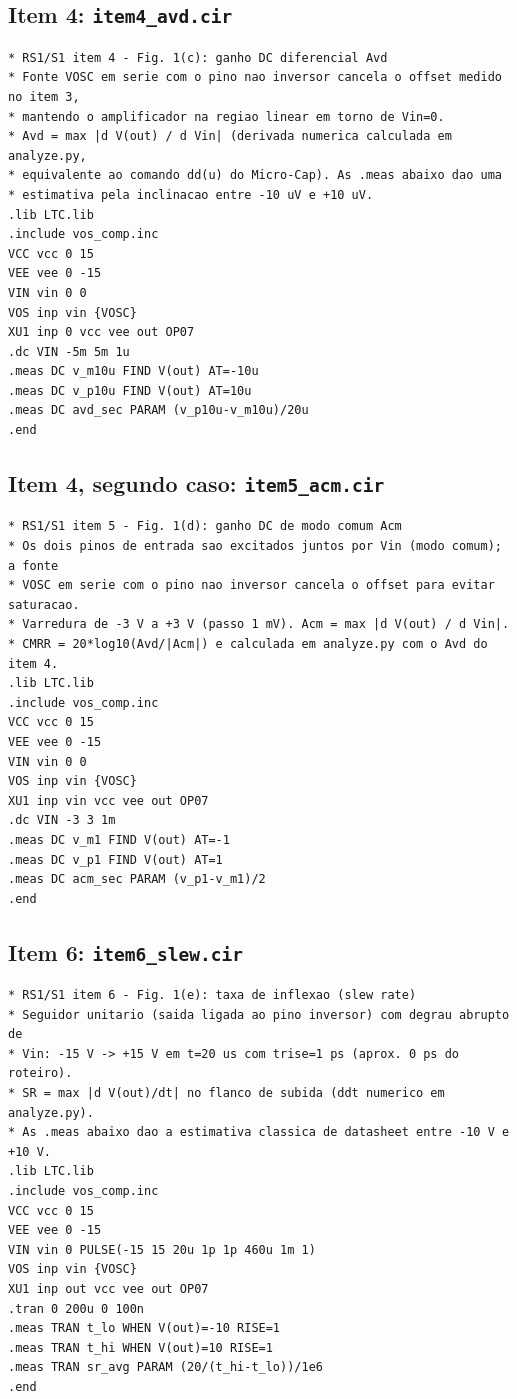 \subsection*{Item 4: \texttt{item4\_avd.cir}}
{\small
\begin{verbatim}
* RS1/S1 item 4 - Fig. 1(c): ganho DC diferencial Avd
* Fonte VOSC em serie com o pino nao inversor cancela o offset medido no item 3,
* mantendo o amplificador na regiao linear em torno de Vin=0.
* Avd = max |d V(out) / d Vin| (derivada numerica calculada em analyze.py,
* equivalente ao comando dd(u) do Micro-Cap). As .meas abaixo dao uma
* estimativa pela inclinacao entre -10 uV e +10 uV.
.lib LTC.lib
.include vos_comp.inc
VCC vcc 0 15
VEE vee 0 -15
VIN vin 0 0
VOS inp vin {VOSC}
XU1 inp 0 vcc vee out OP07
.dc VIN -5m 5m 1u
.meas DC v_m10u FIND V(out) AT=-10u
.meas DC v_p10u FIND V(out) AT=10u
.meas DC avd_sec PARAM (v_p10u-v_m10u)/20u
.end
\end{verbatim}
}

\subsection*{Item 4, segundo caso: \texttt{item5\_acm.cir}}
{\small
\begin{verbatim}
* RS1/S1 item 5 - Fig. 1(d): ganho DC de modo comum Acm
* Os dois pinos de entrada sao excitados juntos por Vin (modo comum); a fonte
* VOSC em serie com o pino nao inversor cancela o offset para evitar saturacao.
* Varredura de -3 V a +3 V (passo 1 mV). Acm = max |d V(out) / d Vin|.
* CMRR = 20*log10(Avd/|Acm|) e calculada em analyze.py com o Avd do item 4.
.lib LTC.lib
.include vos_comp.inc
VCC vcc 0 15
VEE vee 0 -15
VIN vin 0 0
VOS inp vin {VOSC}
XU1 inp vin vcc vee out OP07
.dc VIN -3 3 1m
.meas DC v_m1 FIND V(out) AT=-1
.meas DC v_p1 FIND V(out) AT=1
.meas DC acm_sec PARAM (v_p1-v_m1)/2
.end
\end{verbatim}
}

\subsection*{Item 6: \texttt{item6\_slew.cir}}
{\small
\begin{verbatim}
* RS1/S1 item 6 - Fig. 1(e): taxa de inflexao (slew rate)
* Seguidor unitario (saida ligada ao pino inversor) com degrau abrupto de
* Vin: -15 V -> +15 V em t=20 us com trise=1 ps (aprox. 0 ps do roteiro).
* SR = max |d V(out)/dt| no flanco de subida (ddt numerico em analyze.py).
* As .meas abaixo dao a estimativa classica de datasheet entre -10 V e +10 V.
.lib LTC.lib
.include vos_comp.inc
VCC vcc 0 15
VEE vee 0 -15
VIN vin 0 PULSE(-15 15 20u 1p 1p 460u 1m 1)
VOS inp vin {VOSC}
XU1 inp out vcc vee out OP07
.tran 0 200u 0 100n
.meas TRAN t_lo WHEN V(out)=-10 RISE=1
.meas TRAN t_hi WHEN V(out)=10 RISE=1
.meas TRAN sr_avg PARAM (20/(t_hi-t_lo))/1e6
.end
\end{verbatim}
}

